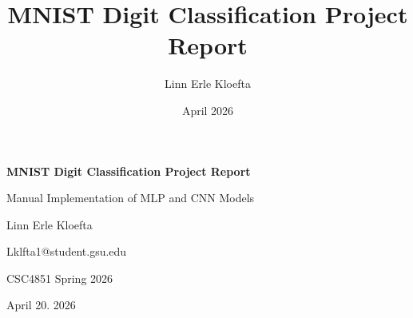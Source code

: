 \documentclass{article}
\title{MNIST Digit Classification Project Report}
\author{Linn Erle Kloefta}
\date{April 2026}
\begin{document}
\begin{titlepage}
\centering
\vspace*{2.5cm}

{\LARGE\bfseries MNIST Digit Classification Project Report\par}
\vspace{0.8cm}
{\large Manual Implementation of MLP and CNN Models\par}

\vspace{2cm}

\vspace{1.2cm}


\vspace{0.2cm}
{\large Linn Erle Kloefta\par}

\vspace{0.6cm}

\vspace{0.2cm}
{\large Lklfta1@student.gsu.edu\par}

\vspace{0.6cm}

\vspace{0.2cm}
{\large CSC4851 Spring 2026\par}

\vspace{0.6cm}

\vspace{0.2cm}
{\large April 20. 2026\par}

\vfill

\end{titlepage}

\newpage
\tableofcontents
\newpage




\end{document}

